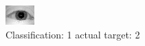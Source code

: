 \begin{figure}[h!]
\begin{center}
\includegraphics[width=0.60\columnwidth]{figures/ID928_class_1_target_2.png}
\end{center}
\caption{ Classification: 1 actual target: 2}
\label{fig:ID928_class_1_target_2}
\end{figure}
